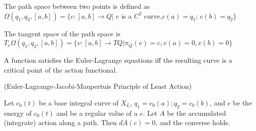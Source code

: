 \begin{defn}

The path space between two points is defined as $ \Omega(q_1, q_2, [a,b]) = \{c: [a,b] \to Q \vert $ c is a $C^2$ curve,$ c(a)=q_1; \hspace{2pt} c(b) = q_2 \} $

\end{defn}

\begin{prop}

The tangent space of the path space is $ T_c \Omega(q_1, q_2, [a,b]) = \{v:[a,b] \to TQ \vert \pi_Q(v)=c, v(a) = 0, v(b)=0 \}$

\end{prop}

\begin{thm}

A function satisfies the Euler-Lagrange equations iff the resulting curve is a critical point of the action functional.

\end{thm}

\begin{thm}{(Euler-Lagrange-Jacobi-Maupertuis Principle of Least Action)}

Let $c_0(t)$ be a base integral curve of $X_L$, $q_1 = c_0(a); q_2 = c_0(b)$, and $e$ be the energy of $c_0(t)$ and be a regular value of a $e$. Let $A$ be the accumulated (integrate) action along a path. Then $dA(c)=0$, and the converse holds.

\end{thm}


